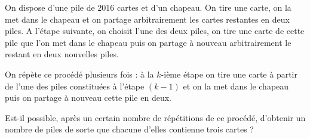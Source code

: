 \documentclass[varwidth]{standalone}
\begin{document}
    On dispose d'une pile de $2016$ cartes et d'un chapeau. On tire une carte, on la met dans le chapeau et on partage arbitrairement les cartes restantes en deux piles. A l'\'etape suivante, on choisit l'une des deux piles, on tire une carte de cette pile que l'on met dans le chapeau puis on partage \`a nouveau arbitrairement le restant en deux nouvelles piles.

    On r\'ep\`ete ce proc\'ed\'e plusieurs fois : \`a la $k$-i\`eme \'etape on tire une carte \`a partir de l'une des piles constitu\'ees \`a l'\'etape $(k - 1)$ et on la met dans le chapeau puis on partage \`a nouveau cette pile en deux.

    Est-il possible, apr\`es un certain nombre de r\'ep\'etitions de ce proc\'ed\'e, d'obtenir un nombre de piles de sorte que chacune d'elles contienne trois cartes ?
\end{document}

